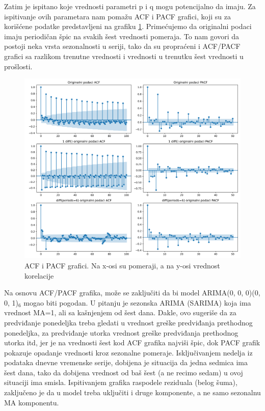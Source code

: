 \documentclass[12pt,oneside]{memoir}
\begin{document}
Zatim je ispitano koje vrednosti parametri p i q mogu potencijalno da imaju. Za ispitivanje ovih parametara nam pomažu ACF i PACF grafici, koji su za korišćene podatke predstavljeni na grafiku \ref{fig: acf_pacf_dnevni}. Primećujemo da originalni podaci imaju periodičan špic na svakih šest vrednosti pomeraja. To nam govori da postoji neka vrsta sezonalnosti u seriji, tako da su propraćeni i ACF/PACF grafici sa razlikom trenutne vrednosti i vrednosti u trenutku šest vrednosti u prošlosti.
\begin{figure}[!ht]
  \centering
  \includegraphics[width=1\textwidth]{./grafici/acf_pacf_dnevni.png}
  \caption{ACF i PACF grafici. Na x-osi su pomeraji, a na y-osi vrednost korelacije}
  \label{fig: acf_pacf_dnevni}
\end{figure}
Na osnovu ACF/PACF grafika, može se zaključiti da bi model ARIMA(0, 0, 0)(0, 0, 1)$_6$ mogao biti pogodan. U pitanju je sezonska ARIMA (SARIMA) koja ima vrednost MA=1, ali sa kašnjenjem od šest dana. Dakle, ovo sugeriše da za predviđanje ponedeljka treba gledati u vrednost greške predviđanja prethodnog ponedeljka, za predviđanje utorka vrednost greške predviđanja prethodnog utorka itd, jer je na vrednosti šest kod ACF grafika najviši špic, dok PACF grafik pokazuje opadanje vrednosti kroz sezonalne pomeraje. Isključivanjem nedelja iz podataka dnevne vremenske serije, dobijena je situacija da jedna sedmica ima šest dana, tako da dobijena vrednost od baš šest (a ne recimo sedam) u ovoj situaciji ima smisla. Ispitivanjem grafika raspodele reziduala (belog šuma), zaključeno je da u model treba uključiti i druge komponente, a ne samo sezonalnu MA komponentu.
\end{document}
